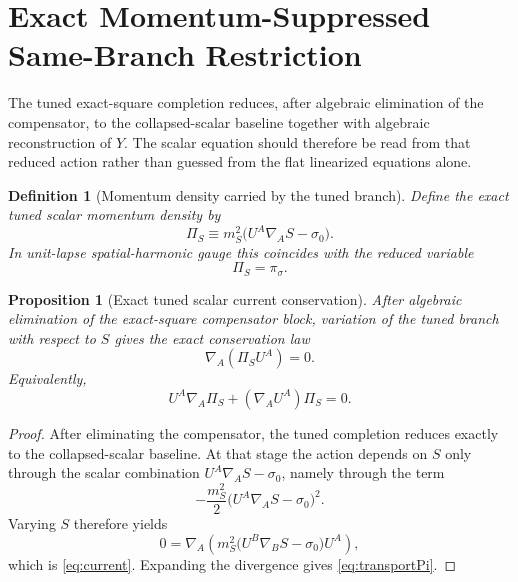 \documentclass[11pt]{article}
\newtheorem{definition}{Definition}
\newtheorem{proposition}{Proposition}
\begin{document}
\section{Exact Momentum-Suppressed Same-Branch Restriction}

The tuned exact-square completion reduces, after algebraic elimination of the compensator, to the collapsed-scalar baseline together with algebraic reconstruction of \(Y\). The scalar equation should therefore be read from that reduced action rather than guessed from the flat linearized equations alone.

\begin{definition}[Momentum density carried by the tuned branch]
\label{def:PiS}
Define the exact tuned scalar momentum density by
\begin{equation}
\Pi_S
\equiv
m_S^2\bigl(U^A\nabla_A S-\sigma_0\bigr).
\label{eq:PiS}
\end{equation}
In unit-lapse spatial-harmonic gauge this coincides with the reduced variable
\begin{equation}
\Pi_S=\pi_\sigma.
\label{eq:PiSpisigma}
\end{equation}
\end{definition}

\begin{proposition}[Exact tuned scalar current conservation]
\label{prop:current}
After algebraic elimination of the exact-square compensator block, variation of the tuned branch with respect to \(S\) gives the exact conservation law
\begin{equation}
\nabla_A\!\left(\Pi_S U^A\right)=0.
\label{eq:current}
\end{equation}
Equivalently,
\begin{equation}
U^A\nabla_A\Pi_S
+
(\nabla_AU^A)\Pi_S
=
0.
\label{eq:transportPi}
\end{equation}
\end{proposition}

\begin{proof}
After eliminating the compensator, the tuned completion reduces exactly to the collapsed-scalar baseline. At that stage the action depends on \(S\) only through the scalar combination \(U^A\nabla_A S-\sigma_0\), namely through the term
\[
-\frac{m_S^2}{2}\bigl(U^A\nabla_A S-\sigma_0\bigr)^2.
\]
Varying \(S\) therefore yields
\[
0
=
\nabla_A\!\left(
m_S^2\bigl(U^B\nabla_BS-\sigma_0\bigr)U^A
\right),
\]
which is \eqref{eq:current}. Expanding the divergence gives \eqref{eq:transportPi}.
\end{proof}
\end{document}
